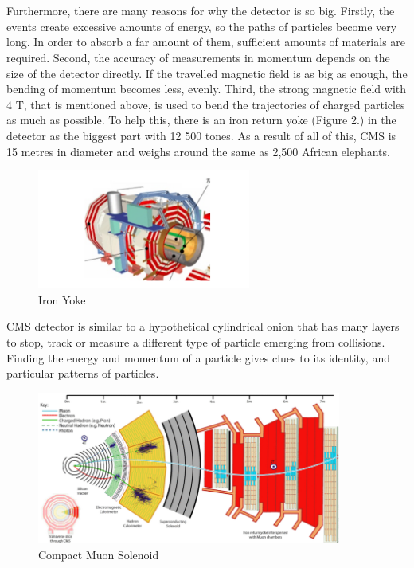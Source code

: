 \documentclass[11pt, oneside]{article}   	%
\begin{document}
\\\\
Furthermore, there are many reasons for why the detector is so big. Firstly, the events create excessive amounts of energy, so the paths of particles
become very long. In order to absorb a far amount of them, sufficient amounts of materials are required. Second, the accuracy of measurements in momentum
depends on the size of the detector directly. If the travelled magnetic field is as big as enough, the bending of momentum becomes less, evenly.
Third, the strong magnetic field with 4 T, that is mentioned above, is used to bend the trajectories of charged particles as much as possible. To help this, there is an iron
return yoke (Figure 2.) in the detector as the biggest part with 12 500 tones. As a result of all of this, CMS is 15 metres in diameter and weighs around
the same as 2,500 African elephants.
\begin{figure}[H]
\begin{center}
\includegraphics[width=7cm]{a2.png}
\end{center}
\caption{Iron Yoke}
\end{figure}




CMS detector is similar to a hypothetical cylindrical onion that has many layers to stop, track or measure a different type
of particle emerging from collisions. Finding the energy and momentum of a particle gives clues to its identity, and particular
patterns of particles. 

\begin{figure}[H]
\begin{center}
\includegraphics[width=10cm]{r3.png}
\end{center}
\caption{Compact Muon Solenoid }
\end{figure}
\end{document}

